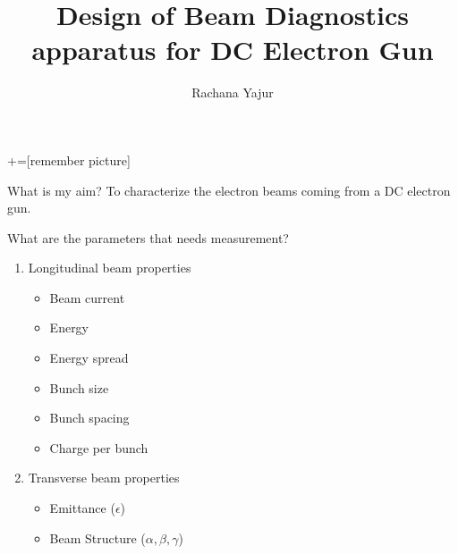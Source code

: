 \documentclass{beamer} %
\author{Rachana Yajur}
\title{Design of Beam Diagnostics apparatus for DC Electron Gun}
\begin{document}
\maketitle

+=[remember picture]

\everymath{\displaystyle}


\begin{frame}{What is my aim?}
    To characterize the electron beams coming from a DC electron gun.  
\end{frame}

\begin{frame}{What are the parameters that needs measurement? }
   
    \begin{enumerate}
    
        \item Longitudinal beam properties
        \begin{itemize}
            \item Beam current
            \item Energy
            \item Energy spread
            \item Bunch size 
            \item Bunch spacing
            \item Charge per bunch
        \end{itemize}
        \item Transverse beam properties
        \begin{itemize}
            \item Emittance ($\epsilon$)
            \item Beam Structure ($\alpha, \beta ,\gamma$)
        \end{itemize}
    \end{enumerate}
    
\end{frame}
\end{document}
